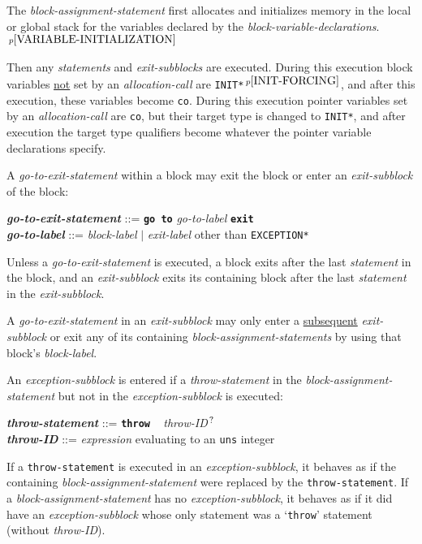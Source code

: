 \documentclass[12pt]{article}
\newcommand{\TT}[1]{{\tt \bfseries #1}}
\newcommand{\QMARK}{{$^{\,\mbox{\footnotesize ?}}$}}
\newcommand{\ttkey}[1]{{\tt \bfseries #1}}
\newcommand{\emkey}[1]{{\em \bfseries #1}}
\newcommand{\pagnote}[1]{$\,^{p\pageref{#1}}$}
\newenvironment{indpar}[1][0.3in]%
	{\begin{list}{}%
		     {\setlength{\itemsep}{0in}%
		      \setlength{\topsep}{0in}%
		      \setlength{\parsep}{1ex}%
		      \setlength{\labelwidth}{#1}%
		      \setlength{\leftmargin}{#1}%
		      \addtolength{\leftmargin}{\labelsep}}%
	 \item}%
	{\end{list}}
\begin{document}
The {\em block-assignment-statement}
first allocates and initializes memory in the local or global stack
for the variables declared by the {\em block-variable-declarations}.%
\pagnote{VARIABLE-INITIALIZATION}

Then any {\em statements} and
{\em exit-subblocks} are executed.  During this execution
block variables \underline{not} set by an {\em allocation-call}
are {\tt *INIT*}\pagnote{INIT-FORCING},
and after this execution, these variables become
{\tt co}.  During this execution pointer variables set by
an {\em allocation-call} are {\tt co}, but their target type is changed
to {\tt *INIT*}, and after execution the target type
qualifiers become whatever the pointer variable declarations specify.

A {\em go-to-exit-statement} within a block may exit the block or
enter an {\em exit-subblock} of the block:
\begin{indpar}
\emkey{go-to-exit-statement}\label{GO-TO-STATEMENT} ::=
    \ttkey{go to} {\em go-to-label} \TT{exit}
\\[0.5ex]
\emkey{go-to-label} ::= {\em block-label} $|$ {\em exit-label} other than
                        {\tt *EXCEPTION*}
\end{indpar}

Unless a {\em go-to-exit-statement} is executed,
a block exits after the last {\em statement} in the block,
and an {\em exit-subblock} exits its containing block after the last
{\em statement} in the {\em exit-subblock}.

A {\em go-to-exit-statement} in an {\em exit-subblock} may only enter
a \underline{subsequent} {\em exit-subblock} or exit any of its containing
{\em block-assignment-statements} by using that block's {\em block-label}.

An {\em exception-subblock} is entered if a {\em throw-statement}
in the {\em block-assignment-state\-ment}
but not in the {\em exception-subblock} is executed:
\begin{indpar}
\emkey{throw-statement}\label{THROW-STATEMENT} ::=
    \ttkey{throw} ~ {\em throw-ID}\QMARK{} \\
\emkey{throw-ID} ::= {\em expression} evaluating to an {\tt uns} integer
\end{indpar}
If a {\tt throw-statement} is executed in an
{\em exception-subblock}, it behaves as if the containing
{\em block-assignment-statement}
were replaced by the {\tt throw-statement}.  If a
{\em block-assignment-statement} has no {\em exception-subblock},
it behaves as if it did have an {\em exception-subblock} whose only
statement was a `{\tt throw}' statement (without {\em throw-ID}).
\end{document}
